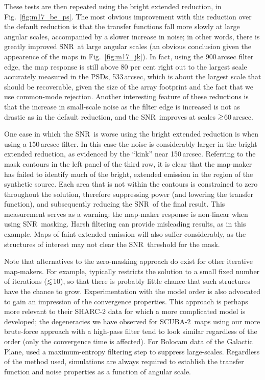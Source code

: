 \documentclass[useAMS,usenatbib,nofootinbib]{mn2e}
\newcommand{\snr}{SNR}
\newcommand{\scuba}{SCUBA-2}
\def\lsim{\mathrel{\lower2.5pt\vbox{\lineskip=0pt\baselineskip=0pt
          \hbox{$<$}\hbox{$\sim$}}}}
\def\gsim{\mathrel{\lower2.5pt\vbox{\lineskip=0pt\baselineskip=0pt
          \hbox{$>$}\hbox{$\sim$}}}}
\begin{document}
These tests are then repeated using the bright extended reduction, in
Fig.~\ref{fig:m17_be_ps}. The most obvious improvement with this
reduction over the default reduction is that the transfer functions
fall more slowly at large angular scales, accompanied by a slower
increase in noise; in other words, there is greatly improved \snr\ at
large angular scales (an obvious conclusion given the appearence of
the maps in Fig.~\ref{fig:m17_jk}). In fact, using the 900\,arcsec
filter edge, the map response is still above 80 per cent right out to
the largest scale accurately measured in the PSDs, 533\,arcsec, which
is about the largest scale that should be recoverable, given the size
of the array footprint and the fact that we use common-mode rejection.
Another interesting feature of these reductions is that the increase
in small-scale noise as the filter edge is increased is not as drastic
as in the default reduction, and the \snr\ improves at scales
$\gsim$60\,arcsec.

One case in which the \snr\ is worse using the bright extended
reduction is when using a 150\,arcsec filter. In this case the noise
is considerably larger in the bright extended reduction, as evidenced
by the ``kink'' near 150\,arcsec. Referring to the mask contours in
the left panel of the third row, it is clear that the map-maker has
failed to identify much of the bright, extended emission in the region
of the synthetic source. Each area that is not within the contours is
constrained to zero throughout the solution, therefore suppressing
power (and lowering the transfer function), and subsequently reducing
the \snr\ of the final result. This measurement serves as a warning:
the map-maker response is non-linear when using \snr\ masking. Harsh
filtering can provide misleading results, as in this example. Maps of
faint extended emission will also suffer considerably, as the
structures of interest may not clear the \snr\ threshold for the mask.

Note that alternatives to the zero-masking approach do exist for other
iterative map-makers. For example, \citet{kovacs2008} typically
restricts the solution to a small fixed number of iterations
($\lsim$10), so that there is probably little chance that such
structures have the chance to grow. Experimentation with the model
order is also advocated to gain an impression of the convergence
properties. This approach is perhaps more relevant to their SHARC-2
data for which a more complicated model is developed; the degeneracies
we have observed for \scuba\ maps using our more brute-force approach
with a high-pass filter tend to look similar regardless of the order
(only the convergence time is affected).  For Bolocam data of the
Galactic Plane, \citet{aguirre2011} used a maximum-entropy filtering
step to suppress large-scales. Regardless of the method used,
simulations are always required to establish the transfer function and
noise properties as a function of angular scale.
\end{document}

